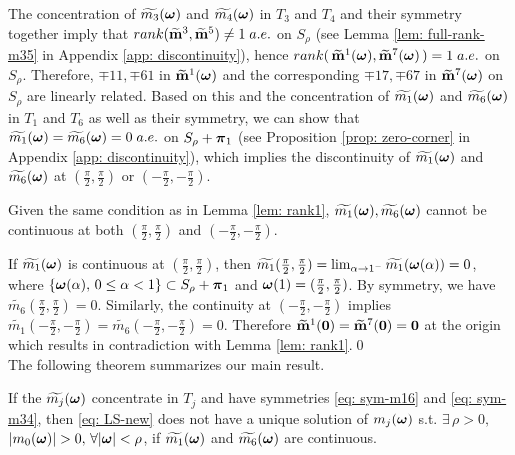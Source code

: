 The concentration of $\widetilde{m_{3}}(\boldsymbol{\omega})$ and $\widetilde{m_{4}}(\boldsymbol{\omega})$ in $T_3$ and $T_4$ and their symmetry together imply that  $rank(\widetilde{\mathbf{m}}^{3},\widetilde{\mathbf{m}}^{5}) \neq 1\; a.e.$ on $S_\rho$ (see Lemma \ref{lem: full-rank-m35} in Appendix \ref{app: discontinuity}), hence $rank(\,\widetilde{\mathbf{m}}^{1}(\boldsymbol{\omega}),\widetilde{\mathbf{m}}^{7}(\boldsymbol{\omega})\,) = 1\; a.e.$ on $S_\rho$.
Therefore, $\mp{1}{1}, \mp{6}{1}$ in $\widetilde{\mathbf{m}}^{1}(\boldsymbol{\omega})$ and the corresponding $\mp{1}{7}, \mp{6}{7}$ in $\widetilde{\mathbf{m}}^{7}(\boldsymbol{\omega})$ on $S_\rho$ are linearly related. Based on this and the concentration of $\widetilde{m_{1}}(\boldsymbol{\omega})$ and $\widetilde{m_{6}}(\boldsymbol{\omega})$ in $T_1$ and $T_6$ as well as their symmetry, we can show that $\widetilde{m_{1}}(\boldsymbol{\omega})=\widetilde{m_{6}}(\boldsymbol{\omega})=0\; a.e.$ on $S_\rho + \boldsymbol{\pi}_1$ (see Proposition \ref{prop: zero-corner} in Appendix \ref{app: discontinuity}), which implies the discontinuity of $\widetilde{m_{1}}(\boldsymbol{\omega})$ and $\widetilde{m_{6}}(\boldsymbol{\omega})$ at $(\frac{\pi}{2},\frac{\pi}{2})$ or $(-\frac{\pi}{2},-\frac{\pi}{2})$.

\begin{proposition}\label{prop: continuity}
Given the same condition as in Lemma \ref{lem: rank1}, $\widetilde{m_{1}}(\boldsymbol{\omega}),\widetilde{m_{6}}(\boldsymbol{\omega})$ cannot be continuous at both $(\frac{\pi}{2},\frac{\pi}{2})$ and $(-\frac{\pi}{2},-\frac{\pi}{2})$.
\end{proposition}
If $\widetilde{m_{1}}(\boldsymbol{\omega})$ is continuous at $(\frac{\pi}{2},\frac{\pi}{2})$, then $\widetilde{m_1}(\frac{\pi}{2},\frac{\pi}{2}) = \lim_{\alpha\rightarrow 1^-}\widetilde{m_1}(\boldsymbol{\omega}(\alpha)) = 0$, where $\{\boldsymbol{\omega}(\alpha),\,0\leq \alpha<1\} \subset S_\rho + \boldsymbol{\pi}_1$ and $\boldsymbol{\omega}(1) = (\frac{\pi}{2},\frac{\pi}{2})$. By symmetry, we have $\widetilde{m_6}(\frac{\pi}{2},\frac{\pi}{2}) = 0$. Similarly, the continuity at $(-\frac{\pi}{2},-\frac{\pi}{2})$ implies $\widetilde{m_1}(-\frac{\pi}{2},-\frac{\pi}{2}) = \widetilde{m_6}(-\frac{\pi}{2},-\frac{\pi}{2}) = 0$. Therefore $\widetilde{\mathbf{m}}^{1}(\boldsymbol{0}) = \widetilde{\mathbf{m}}^{7}(\boldsymbol{0}) = \mathbf{0}$ at the origin which results in contradiction with Lemma \ref{lem: rank1}.\qed\\[1em]%
The following theorem summarizes our main result.
\begin{theorem}\label{thm: thm}
If the $\widetilde{m_{j}}(\boldsymbol{\omega})$ concentrate in $T_j$ and have symmetries \eqref{eq: sym-m16} and \eqref{eq: sym-m34}, then \eqref{eq: LS-new} does not have a unique solution of $m_j(\boldsymbol{\omega})$ s.t. $\exists\,\rho>0,$ $|m_0(\V{\omega})|> 0, \, \forall |\V{\omega}|<\rho$, if $\widetilde{m_{1}}(\boldsymbol{\omega})$ and $\widetilde{m_{6}}(\boldsymbol{\omega})$ are continuous.
\end{theorem}

